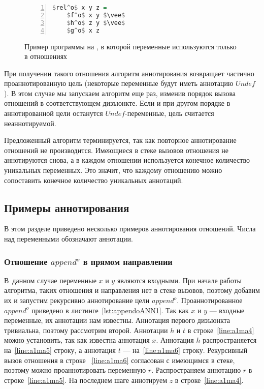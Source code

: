 \documentclass[conference,american,russian]{IEEEtran}
\begin{document}
\begin{figure}[h!]
  \begin{center}
  \begin{minipage}{0.18\textwidth}
  \begin{lstlisting}[language=Haskell, frame=single, numbers=left,numberstyle=\small, escapechar=|]
  $rel^o$ x y z =
    $f^o$ x y $\vee$
    $h^o$ z y $\vee$
    $g^o$ x z
    \end{lstlisting}
  \end{minipage}
  \end{center}
  \caption{Пример программы на \miniKanren{}, в которой переменные используются только в отношениях}
  \label{lst:reloDEF}
\end{figure}

При получении такого отношения алгоритм аннотирования возвращает частично проаннотированную цель (некоторые переменные будут иметь аннотацию  $Undef$).
В этом случае мы запускаем алгоритм еще раз, изменив порядок вызова отношений в соответствующем дизъюнкте.
Если и при другом порядке в аннотированной цели останутся $Undef$-переменные, цель считается неаннотируемой.

Предложенный алгоритм терминируется, так как повторное аннотирование отношений не производится.
Имеющиеся в стеке вызовов отношения не аннотируются снова, а в каждом отношении используется конечное количество уникальных переменных. 
Это значит, что каждому отношению можно сопоставить конечное количество уникальных аннотаций.

\subsection{Примеры аннотирования}

В этом разделе приведено несколько примеров аннотирования отношений.
Числа над переменными обозначают аннотации.

\subsubsection{Отношение $append^o$ в прямом направлении}

В~данном случае  переменные $x$ и $y$ являются входными. 
При начале работы алгоритма, таких отношения и направления нет в стеке вызовов, поэтому добавим их и запустим рекурсивно аннотирование цели $append^o$. 
Проаннотированное $append^o$ приведено в листинге~\ref{lst:appendoANN1}.
Так как $x$ и $y$ --- входные переменные, их аннотации нам известны.
Аннотация первого дизъюнкта тривиальна, поэтому рассмотрим второй.
Аннотации $h$ и $t$ в строке~\ref{line:a1ma4} можно установить, так как известна аннотация $x$.
Аннотация $h$ распространяется на~\ref{line:a1ma5} строку, а аннотация $t$ --- на~\ref{line:a1ma6} строку.
Рекурсивный вызов отношения в строке ~\ref{line:a1ma6} согласован с имеющимся в стеке, поэтому можно проаннотировать переменную $r$.
Распространяем аннотацию $r$ в строке~\ref{line:a1ma5}.
На последнем шаге аннотируем $z$ в строке~\ref{line:a1ma4}.
\end{document}
